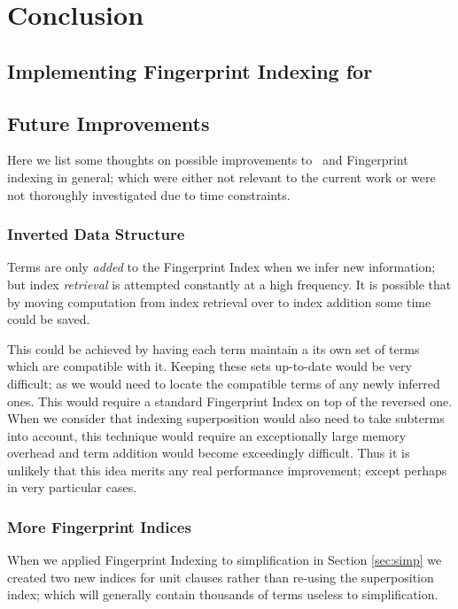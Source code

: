
\chapter{Conclusion}
\label{cha:conclusion}

\section{Implementing Fingerprint Indexing for \Beagle}

\section{Future Improvements}
\label{sec:future}

Here we list some thoughts on possible improvements to \beagle\ and Fingerprint
indexing in general; which were either not relevant to the current work or
were not thoroughly investigated due to time constraints.


\subsection{Inverted Data Structure}
\label{sec:refd}

Terms are only \emph{added} to the Fingerprint Index when we infer new information;
but index \emph{retrieval} is attempted constantly at a high frequency. It is possible
that by moving computation from index retrieval over to index addition some time could
be saved.

This could be achieved by having each term maintain a its own set of terms which
are compatible with it. Keeping these sets up-to-date would be very difficult; as we would
need to locate the compatible terms of any newly inferred ones. This would require a standard
Fingerprint Index on top of the reversed one. When we consider that indexing superposition
would also need to take subterms into account, this technique would require
an exceptionally large memory overhead and term addition would become exceedingly difficult.
Thus it is unlikely that this idea merits any real performance improvement; except
perhaps in very particular cases.

\subsection{More Fingerprint Indices}

When we applied Fingerprint Indexing to simplification in Section \ref{sec:simp}
we created two new indices for unit clauses rather than re-using the superposition
index; which will generally contain thousands of terms useless to simplification.

